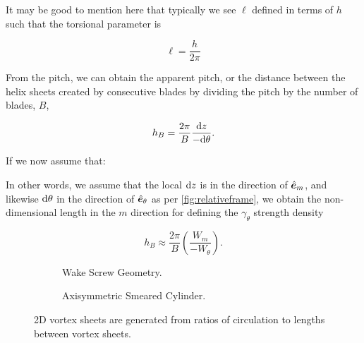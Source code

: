 It may be good to mention here that typically we see \(\ell\) defined in terms of \(h\) such that the torsional parameter is

\begin{equation}
    \ell = \frac{h}{2\pi}
\end{equation}

\noindent From the pitch, we can obtain the apparent pitch, or the distance between the helix sheets created by consecutive blades by dividing the pitch by the number of blades, \(B\),

\begin{equation}
    h_B = \frac{2\pi}{B}  \frac{\mathrm{d} z}{-\mathrm{d} \theta}.
\end{equation}

If we now assume that:

\begin{assumption}




\end{assumption}

\noindent In other words, we assume that the local \(\mathrm{d} z\) is in the direction of \(\hat{\bm{e}}_m\), and likewise \(\mathrm{d}\theta\) in the direction of \(\hat{\bm{e}}_\theta\) as per \cref{fig:relativeframe}, we obtain the non-dimensional length in the \(m\) direction for defining the \(\gamma_\theta\) strength density

\begin{equation}
    h_B \approx \frac{2\pi}{B} \left(\frac{W_m}{-W_\theta}\right).
\end{equation}

\begin{figure}[h!]
     \centering
     \begin{subfigure}[t]{0.45\textwidth}
        \centering
        
        \caption{Wake Screw Geometry.}
        \label{}
     \end{subfigure}
     \hfill
     \begin{subfigure}[t]{0.45\textwidth}
         \centering
        
        \caption{Axisymmetric Smeared Cylinder.}
        \label{}
     \end{subfigure}
     \caption{2D vortex sheets are generated from ratios of circulation to lengths between vortex sheets.}
    \label{fig:smearscrew}
\end{figure}

